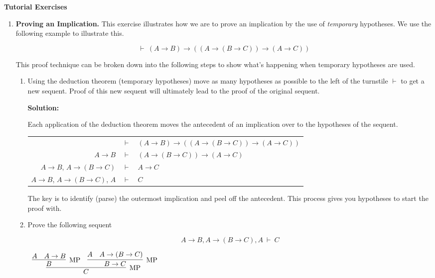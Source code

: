 \documentclass[11pt]{report}
\begin{document}
\newpage
{\bf Tutorial Exercises}
\begin{enumerate}

	\item \textbf{Proving an Implication.} This exercise illustrates how we are to prove an implication by the use of \emph{temporary} hypotheses. We use the following example to illustrate this.
	
	$$\vdash \ (A \to B) \to ((A \to (B \to C)) \to (A \to C))$$

	This proof technique can be broken down into the following steps to show what's happening when temporary hypotheses are used. 

	\begin{enumerate}

		\item Using the deduction theorem (temporary hypotheses) move as many hypotheses as possible to the left of the turnstile $\vdash$ to get a new sequent. Proof of this new sequent will ultimately lead to the proof of the original sequent.
		
		\textbf{Solution:}

		Each application of the deduction theorem moves the antecedent of an implication over to the hypotheses of the sequent. 

		\begin{tabular}{r c l}
			& $\vdash$ & $(A \to B) \to ((A \to (B \to C)) \to (A \to C))$ \\
			$A \to B$ & $\vdash$ & $(A \to (B \to C)) \to (A \to C)$ \\
			$A \to B$, $A \to (B \to C)$ & $\vdash$ & $A \to C$ \\
			$A \to B$, $A \to (B \to C)$, $A$ & $\vdash$ & $C$ \\
		\end{tabular}

		The key is to identify (parse) the outermost implication and peel off the antecedent. This process gives you hypotheses to start the proof with. 

		\item Prove the following sequent 
		
		$$ A \to B, A \to (B \to C), A \ \vdash \ C$$

			\begin{center}
				$\begin{array}{c}
					\infer[\MP]{C}
						{\infer[\MP]{B}
							{A & A \to B} & 
						\infer[\MP]{B \to C}
							{A & A \to (B \to C)}}
				\end{array}$
			\end{center}


\end{enumerate}
\end{enumerate}
\end{document}
